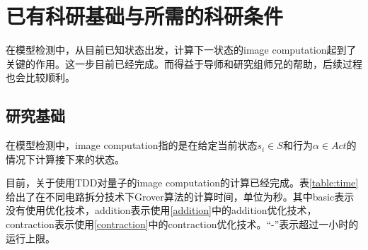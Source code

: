 \chapter{已有科研基础与所需的科研条件}
在模型检测中，从目前已知状态出发，计算下一状态的image computation起到了关键的作用。这一步目前已经完成。而得益于导师和研究组师兄的帮助，后续过程也会比较顺利。
\section{研究基础}
在模型检测中，image computation指的是在给定当前状态$s_i\in S$和行为$\alpha\in Act$的情况下计算接下来的状态。

目前，关于使用TDD对量子的image computation的计算已经完成。表\ref{table:time}给出了在不同电路拆分技术下Grover算法的计算时间，单位为秒。其中basic表示没有使用优化技术，addition表示使用\ref{addition}中的addition优化技术，contraction表示使用\ref{contraction}中的contraction优化技术。“-”表示超过一小时的运行上限。
